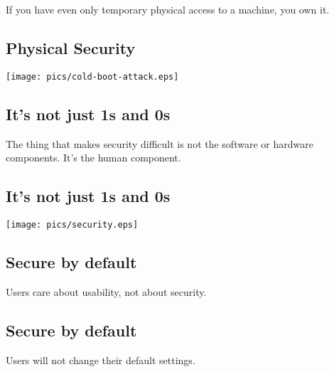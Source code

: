 \documentclass[xga]{xdvislides}
\begin{document}
\Huge
\begin{center}
If you have even only temporary physical access to a machine, you own it.
\end{center}
\Normalsize

\subsection{Physical Security}
\vspace*{\fill}
\begin{center}
	\texttt{[image: pics/cold-boot-attack.eps]}
\end{center}
\vspace*{\fill}


\subsection{It's not just 1s and 0s}
\vspace{.5in}
\Huge
\begin{center}
The thing that makes security difficult is not the software or hardware
components.  It's the human component.
\end{center}
\Normalsize

\subsection{It's not just 1s and 0s}
\vspace*{\fill}
\begin{center}
	\texttt{[image: pics/security.eps]}
\end{center}
\vspace*{\fill}



\subsection{Secure by default}
\vspace{.5in}
\Huge
\begin{center}
Users care about usability, not about security.
\end{center}
\Normalsize

\subsection{Secure by default}
\vspace{.5in}
\Huge
\begin{center}
Users will not change their default settings.
\end{center}
\Normalsize
\end{document}
